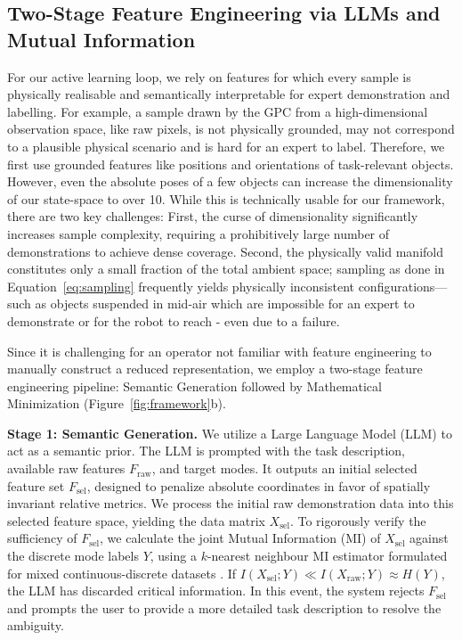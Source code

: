 \documentclass[journal]{IEEEtran}
\begin{document}
\subsection{Two-Stage Feature Engineering via LLMs and Mutual Information} \label{sec:feature_engineering}
For our active learning loop, we rely on features for which every sample is physically realisable and semantically interpretable for expert demonstration and labelling. For example, a sample drawn by the GPC from a high-dimensional observation space, like raw pixels, is not physically grounded, may not correspond to a plausible physical scenario and is hard for an expert to label. Therefore, we first use grounded features like positions and orientations of task-relevant objects. However, even the absolute poses of a few objects can increase the dimensionality of our state-space to over 10. While this is technically usable for our framework, there are two key challenges: First, the curse of dimensionality significantly increases sample complexity, requiring a prohibitively large number of demonstrations to achieve dense coverage. Second, the physically valid manifold constitutes only a small fraction of the total ambient space; sampling as done in Equation~\ref{eq:sampling} frequently yields physically inconsistent configurations—such as objects suspended in mid-air which are impossible for an expert to demonstrate or for the robot to reach - even due to a failure.

Since it is challenging for an operator not familiar with feature engineering to manually construct a reduced representation, we employ a two-stage feature engineering pipeline: Semantic Generation followed by Mathematical Minimization (Figure~\ref{fig:framework}b).

\textbf{Stage 1: Semantic Generation.} We utilize a Large Language Model (LLM) \cite{gemini} to act as a semantic prior. The LLM is prompted with the task description, available raw features $F_{\text{raw}}$, and target modes. It outputs an initial selected feature set $F_{\text{sel}}$, designed to penalize absolute coordinates in favor of spatially invariant relative metrics. We process the initial raw demonstration data into this selected feature space, yielding the data matrix $X_{\text{sel}}$. To rigorously verify the sufficiency of $F_{\text{sel}}$, we calculate the joint Mutual Information (MI) of $X_{\text{sel}}$ against the discrete mode labels $Y$, using a $k$-nearest neighbour MI estimator formulated for mixed continuous-discrete datasets \cite{10.1371/journal.pone.0087357}. If $I(X_{\text{sel}}; Y) \ll I(X_{\text{raw}}; Y) \approx H(Y)$, the LLM has discarded critical information. In this event, the system rejects $F_{\text{sel}}$ and prompts the user to provide a more detailed task description to resolve the ambiguity.
\end{document}
